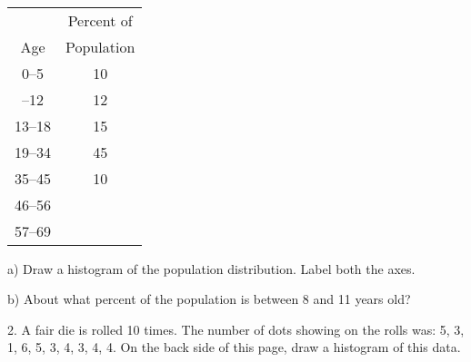 \documentclass[10pt]{article}
\begin{document}
{\ }\hspace{10pt}\begin{tabular}{cc}
       & Percent of\\
Age    & Population\\\hline
0--5   & 10\vphantom{\Large Y}\\  %
\Z6--12  & 12\\                   %
13--18 & 15\\                     %
19--34 & 45\\                     %
35--45 & 10\\                     %
46--56 & \Z5\\                    %
57--69 & \Z3                      %
\end{tabular}
\vspace{.5in}

\hspace{5pt} a) Draw a histogram of the population distribution.  Label
both the axes.

\hspace{5pt} b) About what percent  of the population is between 8 and 11 years old?
\vspace{.5in}


2. A fair die is rolled 10 times.  The number of dots showing on the rolls
was:  5, 3, 1, 6, 5, 3, 4, 3, 4, 4. On the back side of this page, 
draw a histogram of this data.
\vspace{.5in}
\end{document}

